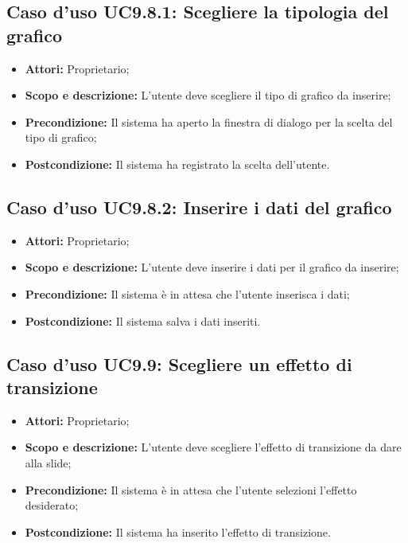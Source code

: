 	\subsection{Caso d'uso UC9.8.1: Scegliere la tipologia del grafico}
	\begin{itemize}
		\item \textbf{Attori:} Proprietario;
		\item \textbf{Scopo e descrizione:} L'utente deve scegliere il tipo di grafico da inserire;
		\item \textbf{Precondizione:} Il sistema ha aperto la finestra di dialogo per la scelta del tipo di grafico;
		\item \textbf{Postcondizione:} Il sistema ha registrato la scelta dell'utente.
	\end{itemize}
	
	\subsection{Caso d'uso UC9.8.2: Inserire i dati del grafico}
	\begin{itemize}
		\item \textbf{Attori:} Proprietario;
		\item \textbf{Scopo e descrizione:} L'utente deve inserire i dati per il grafico da inserire;
		\item \textbf{Precondizione:} Il sistema è in attesa che l'utente inserisca i dati;
		\item \textbf{Postcondizione:} Il sistema salva i dati inseriti.
	\end{itemize}


\subsection{Caso d'uso UC9.9: Scegliere un effetto di transizione}
\begin{itemize}
	\item \textbf{Attori:} Proprietario;
	\item \textbf{Scopo e descrizione:} L'utente deve scegliere l'effetto di transizione da dare alla slide;
	\item \textbf{Precondizione:} Il sistema è in attesa che l'utente selezioni l'effetto desiderato;
	\item \textbf{Postcondizione:} Il sistema ha inserito l'effetto di transizione.
\end{itemize}


